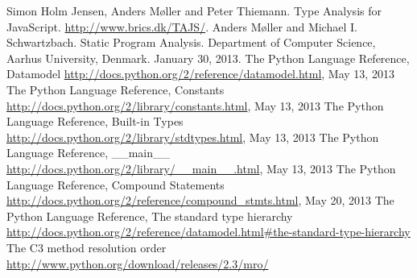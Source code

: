 \begin{thebibliography}{8}

 Simon Holm Jensen, Anders M\o ller and Peter Thiemann. Type Analysis for JavaScript. \url{http://www.brics.dk/TAJS/}.
 Anders M\o ller and Michael I. Schwartzbach. Static Program Analysis. Department of Computer Science, Aarhus University, Denmark. January 30, 2013.
 The Python Language Reference, Datamodel \url{http://docs.python.org/2/reference/datamodel.html}, May 13, 2013
 The Python Language Reference, Constants \url{http://docs.python.org/2/library/constants.html}, May 13, 2013
 The Python Language Reference, Built-in Types \url{http://docs.python.org/2/library/stdtypes.html}, May 13, 2013
 The Python Language Reference, \_\_main\_\_ \url{http://docs.python.org/2/library/__main__.html}, May 13, 2013
 The Python Language Reference, Compound Statements \url{http://docs.python.org/2/reference/compound_stmts.html}, May 20, 2013
 The Python Language Reference, The standard type hierarchy \url{http://docs.python.org/2/reference/datamodel.html#the-standard-type-hierarchy}
 The C3 method resolution order \url{http://www.python.org/download/releases/2.3/mro/}
	
\end{thebibliography}